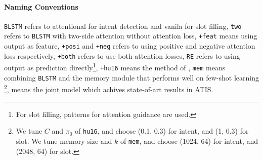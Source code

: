 \paragraph{Naming Conventions}
\texttt{BLSTM} refers to attentional \BLSTM for intent detection and vanila \BLSTM for slot filling, \texttt{two} refers to \texttt{BLSTM} with two-side attention without attention loss, \texttt{+feat} means using \RE output as feature, \texttt{+posi} and \texttt{+neg} refers to using positive and negative attention loss respectively, \texttt{+both} refers to use both attention losses, \texttt{RE} refers to using \RE output as prediction directly\footnote{
For slot filling, patterns for attention guidance are used.}, 
\texttt{+hu16} means the method of \cite{liu2016attention}, \texttt{mem} means combining \texttt{BLSTM} and the memory module that performs well on few-shot learning \cite{kaiser2017learning}\footnote{
We tune $C$ and $\pi_0$ of \texttt{hu16}, and choose (0.1, 0.3) for intent, and (1, 0.3) for slot. We tune memory-size and $k$ of \texttt{mem}, and choose (1024, 64) for intent, and (2048, 64) for slot.
}, 
\LL means the joint model \cite{liu2016attention} which achives state-of-art results in ATIS. 



